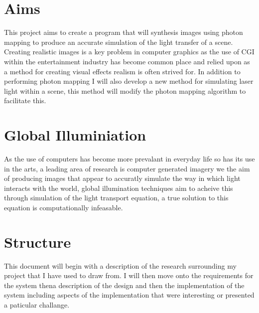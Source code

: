 \section{Aims}
This project aims to create a program that will synthesis images using photon mapping to produce an accurate simulation of the
light transfer of a scene. Creating realistic images is a key problem in computer graphics as the use of CGI within the
entertainment industry has become common place and relied upon as a method for creating visual effects realism is often strived
for. In addition to performing photon mapping I will also develop a new method for simulating laser light within a scene, this
method will modify the photon mapping algorithm to facilitate this.

\section{Global Illuminiation}
As the use of computers has become more prevalant in everyday life so has its use in the arts, a leading area of research is
computer generated imagery we the aim of producing images that appear to accuratly simulate the way in which light interacts
with the world, global illumination techniques aim to acheive this through simulation of the light transport equation, a true
solution to this equation is computationally infeasable. 

\section{Structure}
This document will begin with a description of the research surrounding my project that I have used to draw from. I will then move
onto the requirements for the system thena description of the design and then the implementation of the system including
aspects of the implementation that were interesting or presented a paticular challange.
